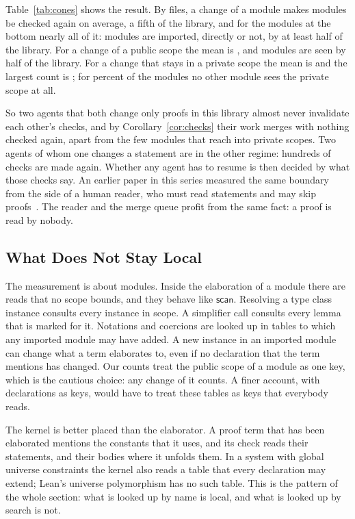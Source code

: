 \documentclass[acmsmall,nonacm,screen]{acmart}
\newcommand{\kw}[1]{\mathsf{#1}}
\newcommand{\scan}{\kw{scan}}
\begin{document}
Table~\ref{tab:cones} shows the result. By files, a change of a module makes
\exConeFileMean{} modules be checked again on average, a fifth of the library, and for the
modules at the bottom nearly all of it: \exConeFileHalf{} modules are imported, directly
or not, by at least half of the library. For a change of a public scope the mean is
\exConePublicMean{}, and \exConePublicHalf{} modules are seen by half of the library. For a
change that stays in a private scope the mean is \exConePrivateMean{} and the largest count
is \exConePrivateMax{}; for \exConePrivateNone{} percent of the modules no other module
sees the private scope at all.

So two agents that both change only proofs in this library almost never invalidate each
other's checks, and by Corollary~\ref{cor:checks} their work merges with nothing checked
again, apart from the few modules that reach into private scopes. Two agents of whom one
changes a statement are in the other regime: hundreds of checks are made again. Whether any
agent has to resume is then decided by what those checks say. An earlier paper in this
series measured the same boundary from the side of a human reader, who must read statements
and may skip proofs~\citep{tpp1}. The reader and the merge queue profit from the same fact:
a proof is read by nobody.

\subsection{What Does Not Stay Local}

The measurement is about modules. Inside the elaboration of a module there are reads that no
scope bounds, and they behave like $\scan$. Resolving a type class instance consults every
instance in scope. A simplifier call consults every lemma that is marked for it. Notations
and coercions are looked up in tables to which any imported module may have added. A new
instance in an imported module can change what a term elaborates to, even if no declaration
that the term mentions has changed. Our counts treat the public scope of a module as one
key, which is the cautious choice: any change of it counts. A finer account, with
declarations as keys, would have to treat these tables as keys that everybody reads.

The kernel is better placed than the elaborator. A proof term that has been elaborated
mentions the constants that it uses, and its check reads their statements, and their bodies
where it unfolds them. In a system with global universe constraints the kernel also reads a
table that every declaration may extend; Lean's universe polymorphism has no such table. This
is the pattern of the whole section: what is looked up by name is local, and what is looked
up by search is not.
\end{document}
